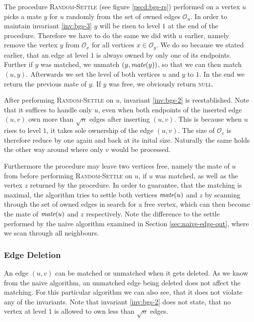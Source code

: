 \documentclass{article}      %
\DeclareMathOperator\mate{\emph{mate}}
\begin{document}
The procedure \textsc{Random-Settle} (see figure \ref{pscd:bgs-rs}) performed on a vertex $u$ picks a mate $y$ for $u$ randomly from the set of owned edges $\mathcal{O}_u$. In order to maintain invariant \ref{inv:bgs-3} $y$ will be risen to level $1$ at the end of the procedure. Therefore we have to do the same we did with $u$ earlier, namely remove the vertex $y$ from $\mathcal{O}_x$ for all vertices $x \in \mathcal{O}_y$. We do so because we stated earlier, that an edge at level $1$ is always owned by only one of its endpoints. Further if $y$ was matched, we unmatch $(y,\mate(y))$, so that we can then match $(u,y)$. Afterwards we set the level of both vertices $u$ and $y$ to $1$. In the end we return the previous mate of $y$. If $y$ was free, we obviously return \textsc{null}.

After performing \textsc{Random-Settle} on $u$, invariant \ref{inv:bgs-2} is reestablished. Note that it suffices to handle only $u$, even when both endpoints of the inserted edge $(u,v)$ own more than $\sqrt{n}$ edges after inserting $(u,v)$. This is because when $u$ rises to level $1$, it takes sole ownership of the edge $(u,v)$. The size of $\mathcal{O}_v$ is therefore reduce by one again and back at its inital size. Naturally the same holds the other way around where only $v$ would be processed.

Furthermore the procedure may leave two vertices free, namely the mate of $u$ from before performing \textsc{Random-Settle} on $u$, if $u$ was matched, as well as the vertex  $z$ returned by the procedure. In order to guarantee, that the matching is maximal, the algorithm tries to settle both vertices $\mate(u)$ and $z$ by scanning through the set of owned edges in search for a free vertex, which can then become the mate of $\mate(u)$ and $z$ respectively. Note the difference to the settle performed by the naive algorithm examined in Section \ref{sec:naive-edge-out}, where we scan through all neighbours.

\subsubsection{Edge Deletion}
\label{sec:bgs-edge-out}

An edge $(u,v)$ can be matched or unmatched when it gets deleted. As we know from the naive algorithm, an unmatched edge being deleted does not affect the matching. For this particular algorithm we can also see, that it does not violate any of the invariants. Note that invariant \ref{inv:bgs-2} does not state, that no vertex at level $1$ is allowed to own less than $\sqrt{n}$ edges.
\end{document}
